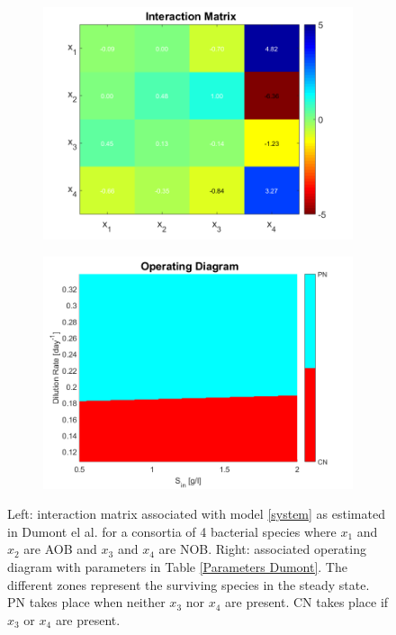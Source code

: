 \documentclass[3p,times]{elsarticle}
\begin{document}
\begin{figure}[ht]
	\centering
	\begin{subfigure}[b]{0.45\textwidth}
		\includegraphics[width=\textwidth]{Interactions_Parameters_Dumont}
	\end{subfigure}
	\begin{subfigure}[b]{0.45\textwidth}
	\includegraphics[width=\textwidth]{OD_parameters_Dumont}
	\end{subfigure}
	\caption{Left: interaction matrix associated with model \eqref{system} as estimated in Dumont el al. \cite{Dumont2016} for a consortia of 4 bacterial species where $x_1$ and $x_2$ are AOB and $x_3$ and $x_4$ are NOB. Right: associated operating diagram with parameters in Table \ref{Parameters Dumont}. The different zones represent the surviving species in the steady state. PN takes place when neither $x_3$ nor $x_4$ are present. CN takes place if $x_3$ or $x_4$ are present.}
	\label{OD Dumont}
\end{figure}
\end{document}
